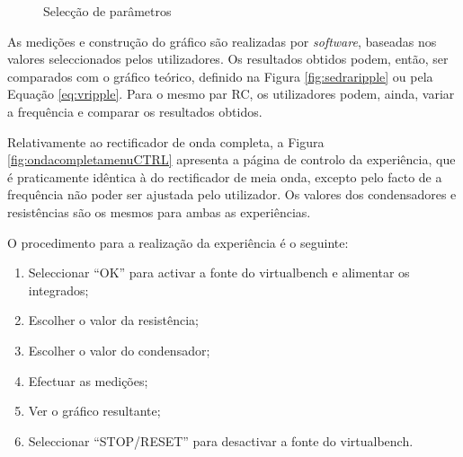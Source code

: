 \begin{figure}[hbtp]
	\centering%
		\centering
		\qquad
		\caption{Selecção de parâmetros}%
		\label{fig:seleccaoparametros}%
\end{figure}

As medições e construção do gráfico são realizadas por \textit{software}, baseadas nos valores seleccionados pelos utilizadores. Os resultados obtidos podem, então, ser comparados com o gráfico teórico, definido na Figura \ref{fig:sedraripple} ou pela Equação \ref{eq:vripple}. Para o mesmo par RC, os utilizadores podem, ainda, variar a frequência e comparar os resultados obtidos.

Relativamente ao rectificador de onda completa, a Figura \ref{fig:ondacompletamenuCTRL} apresenta a página de controlo da experiência, que é praticamente idêntica à do rectificador de meia onda, excepto pelo facto de a frequência não poder ser ajustada pelo utilizador. Os valores dos condensadores e resistências são os mesmos para ambas as experiências.

O procedimento para a realização da experiência é o seguinte:
\begin{enumerate}
	\item Seleccionar ``OK'' para activar a fonte do \acrshort{virtualbench} e alimentar os integrados;
	\item Escolher o valor da resistência;
	\item Escolher o valor do condensador;
	\item Efectuar as medições;
	\item Ver o gráfico resultante;
	\item Seleccionar ``STOP/RESET'' para desactivar a fonte do \acrshort{virtualbench}.
\end{enumerate}

